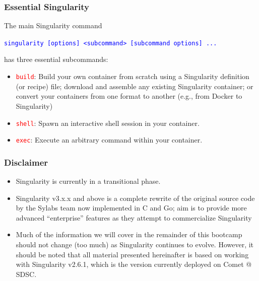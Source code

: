 \documentclass{beamer}
\begin{document}
\begin{frame}
   \frametitle{Essential Singularity}
   The main Singularity command
   \begin{center}
      \textcolor{blue}{\lstinline{singularity [options] <subcommand> [subcommand options] ...}}
   \end{center}
   has three essential subcommands:
   \begin{itemize}
      \setlength\itemsep{1.0em}
      \item \textcolor{red}{\lstinline{build}}: Build your own container 
         from scratch using a Singularity definition (or recipe) file; 
         download and assemble any existing Singularity container; or 
         convert your containers from one format to another (e.g., from 
         Docker to Singularity)
      \item \textcolor{red}{\lstinline{shell}}: Spawn an interactive shell 
         session in your container.
      \item \textcolor{red}{\lstinline{exec}}: Execute an arbitrary 
         command within your container.
   \end{itemize}
\end{frame}

\begin{frame}
   \frametitle{Disclaimer}
   \begin{itemize}
      \setlength\itemsep{1.0em}
      \item Singularity is currently in a transitional phase.
      \item Singularity v3.x.x and above is a complete rewrite of the 
         original source code by the Sylabs team now implemented in 
         C and Go; aim is to provide more advanced ``enterprise'' 
         features as they attempt to commercialize Singularity
      \item Much of the information we will cover in the remainder of 
         this bootcamp should not change (too much) as Singularity 
         continues to evolve. However, it should be noted that all 
         material presented hereinafter is based on working with 
         Singularity v2.6.1, which is the version currently deployed on 
         Comet @ SDSC.
   \end{itemize}
\end{frame}
\end{document}
